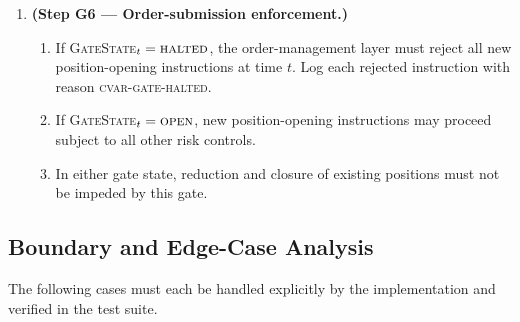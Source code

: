 \documentclass[12pt,openany]{book}
\numberwithin{equation}{chapter}
\theoremstyle{plain}
\theoremstyle{definition}
\theoremstyle{remark}
\numberwithin{equation}{chapter}
\theoremstyle{plain}
\begin{document}
\begin{enumerate}
  \item \textbf{(Step G6 --- Order-submission enforcement.)}
        \begin{enumerate}
          \item If \textsc{GateState}$_t = \textsc{halted}$,
                the order-management layer must reject all
                new position-opening instructions at time $t$.
                Log each rejected instruction with reason
                \textsc{cvar-gate-halted}.
          \item If \textsc{GateState}$_t = \textsc{open}$,
                new position-opening instructions may proceed
                subject to all other risk controls.
          \item In either gate state, reduction and closure of
                existing positions must not be impeded by this gate.
        \end{enumerate}
\end{enumerate}

\subsection{Boundary and Edge-Case Analysis}
\label{ssec:gate-edge-cases}

The following cases must each be handled explicitly by the
implementation and verified in the test suite.
\end{document}
